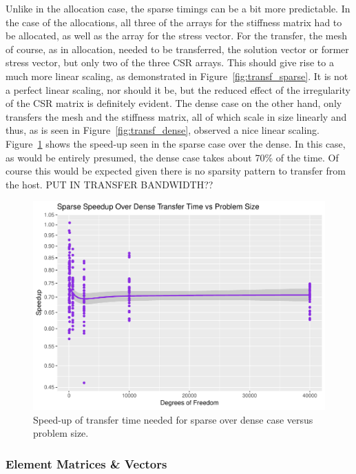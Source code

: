 Unlike in the allocation case, the sparse timings can be a bit more predictable. In the case of the allocations, all three of the arrays for the stiffness matrix had to be allocated, as well as the array for the stress vector. For the transfer, the mesh of course, as in allocation, needed to be transferred, the solution vector or former stress vector, but only two of the three CSR arrays. This should give rise to a much more linear scaling, as demonstrated in Figure~\ref{fig:transf_sparse}. It is not a perfect linear scaling, nor should it be, but the reduced effect of the irregularity of the CSR matrix is definitely evident. The dense case on the other hand, only transfers the mesh and the stiffness matrix, all of which scale in size linearly and thus, as is seen in Figure~\ref{fig:transf_dense}, observed a nice linear scaling. Figure~\ref{fig:transf_su} shows the speed-up seen in the sparse case over the dense. In this case, as would be entirely presumed, the dense case takes about 70\% of the time. Of course this would be expected given there is no sparsity pattern to transfer from the host. PUT IN TRANSFER BANDWIDTH?? 
\begin{figure}
	\centering
	\includegraphics[width = 0.48\linewidth]{Plots/transf_sparse_dense_speedup_vs_n}
	\caption{Speed-up of transfer time needed for sparse over dense case versus problem size.}
	\label{fig:transf_su}
\end{figure}

\subsubsection{Element Matrices \& Vectors}

